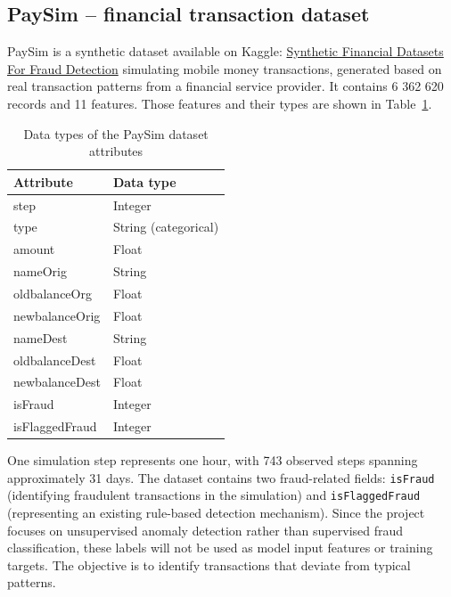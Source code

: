 \documentclass[titlepage]{article}
\begin{document}
\subsection{PaySim -- financial transaction dataset}
PaySim is a synthetic dataset available on Kaggle: \href{https://www.kaggle.com/datasets/ealaxi/paysim1}{Synthetic Financial Datasets For Fraud Detection} simulating mobile money transactions, generated based on real transaction patterns from a financial service provider. It contains 6 362 620 records and 11 features. Those features and their types are shown in Table~\ref{tab:paysim_dtypes}.
\begin{table}[H]
    \centering
    \caption{Data types of the PaySim dataset attributes}
    \label{tab:paysim_dtypes}
    \begin{tabular}{ll}
        \toprule
        \textbf{Attribute} & \textbf{Data type} \\
        \midrule
        step & Integer \\
        type & String (categorical) \\
        amount & Float \\
        nameOrig & String \\
        oldbalanceOrg & Float \\
        newbalanceOrig & Float \\
        nameDest & String \\
        oldbalanceDest & Float \\
        newbalanceDest & Float \\
        isFraud & Integer \\
        isFlaggedFraud & Integer \\
        \bottomrule
    \end{tabular}
\end{table}
One simulation step represents one hour, with 743 observed steps spanning approximately 31 days.
The dataset contains two fraud-related fields: \texttt{isFraud} (identifying fraudulent transactions in the simulation) and \texttt{isFlaggedFraud} (representing an existing rule-based detection mechanism). Since the project focuses on unsupervised anomaly detection rather than supervised fraud classification, these labels will not be used as model input features or training targets. The objective is to identify transactions that deviate from typical patterns.
\end{document}
